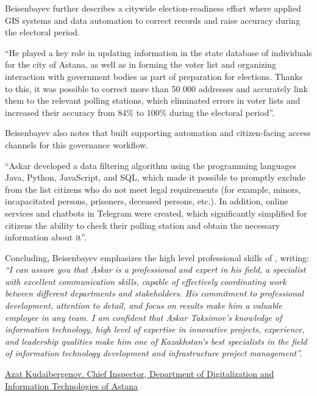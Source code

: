 Beisenbayev further describes a citywide election-readiness effort where \mrl{} applied GIS systems and data automation to correct records and raise accuracy during the electoral period.
\begin{fullquote}
``He played a key role in updating information in the state database of individuals for the city of Astana, as well as in forming the voter list and organizing interaction with government bodies as part of preparation for elections. Thanks to this, it was possible to correct more than 50 000 addresses and accurately link them to the relevant polling stations, which eliminated errors in voter lists and increased their accuracy from 84\% to 100\% during the electoral period''.
\end{fullquote}

Beisenbayev also notes that \mrl{} built supporting automation and citizen-facing access channels for this governance workflow.
\begin{fullquote}
``Askar developed a data filtering algorithm using the programming languages Java, Python, JavaScript, and SQL, which made it possible to promptly exclude from the list citizens who do not meet legal requirements (for example, minors, incapacitated persons, prisoners, deceased persons, etc.). In addition, online services and chatbots in Telegram were created, which significantly simplified for citizens the ability to check their polling station and obtain the necessary information about it''.
\end{fullquote}

Concluding, Beisenbayev emphasizes the high level professional skills of \mrl{}, writing:
\emph{``I can assure you that Askar is a professional and expert in his field, a specialist with excellent communication skills, capable of effectively coordinating work between different departments and stakeholders. His commitment to professional development, attention to detail, and focus on results make him a valuable employee in any team. I am confident that Askar Taksimov's knowledge of information technology, high level of expertise in innovative projects, experience, and leadership qualities make him one of Kazakhstan's best specialists in the field of information technology development and infrastructure project management''.} 
 

\bigskip
\noindent\underline{Azat Kudaibergenov. Chief Inspector, Department of Digitalization and Information Technologies of Astana}

